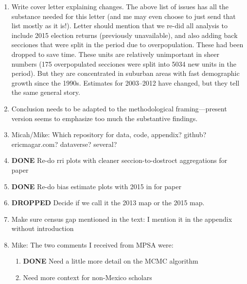\documentclass{article}
\begin{document}
\begin{enumerate}
\item Write cover letter explaining changes. The above list of issues has all the substance needed for this letter (and me may even choose to just send that list mostly as it is!). Letter should mention that we re-did all analysis to include 2015 election returns (previously unavailable), and also adding back secciones that were split in the period due to overpopulation. These had been dropped to save time. These units are relatively unimportant in sheer numbers (175 overpopulated secciones were split into 5034 new units in the period). But they are concentrated in suburban areas with fast demographic growth since the 1990s. Estimates for 2003--2012 have changed, but they tell the same general story.
\label{sec:orgheadline31}
\item Conclusion needs to be adapted to the methodological framing---present version seems to emphasize too much the substantive findings.
\label{sec:orgheadline32}
\item Micah/Mike: Which repository for data, code, appendix? github? ericmagar.com? dataverse? several?
\label{sec:orgheadline33}
\item {\bfseries\sffamily DONE} Re-do rri plots with cleaner seccion-to-dostroct aggregations for paper
\label{sec:orgheadline34}
\item {\bfseries\sffamily DONE} Re-do bias estimate plots with 2015 in for paper
\label{sec:orgheadline35}
\item {\bfseries\sffamily DROPPED} Decide if we call it the 2013 map or the 2015 map.
\label{sec:orgheadline36}
\item Make sure census gap mentioned in the text: I mention it in the appendix without introduction
\label{sec:orgheadline37}
\item Mike: The two comments I received from MPSA were:
\label{sec:orgheadline40}
\begin{enumerate}
\item {\bfseries\sffamily DONE} Need a little more detail on the MCMC algorithm
\label{sec:orgheadline38}
\item Need more context for non-Mexico scholars
\label{sec:orgheadline39}
\end{enumerate}
\end{enumerate}
\end{document}
